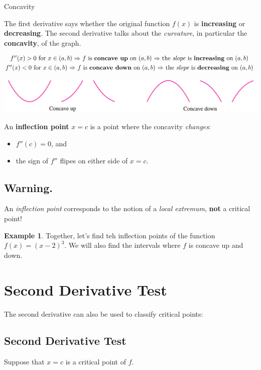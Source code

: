 \message{ !name(11-16_seconddertest.tex)}\documentclass[11pt,reqno,final]{amsart}
\numberwithin{figure}{section}
\theoremstyle{definition} %
\newtheorem{example}[equation]{Example}%
\begin{document}
{Concavity}

The first derivative says whether the original function $f(x)$ is \textbf{increasing} or \textbf{decreasing}.
The second derivative talks about the \textit{curvature}, in particular the \textbf{concavity}, of the graph.

\begin{framed}
        \begin{gather*}
                \mbox{$f''(x) > 0$ for $x \in (a,b)$
                  $\Rightarrow$
                  $f$ is \textbf{concave up} on $(a,b)$
                  $\Rightarrow$
                  the \textit{slope} is \textbf{increasing} on $(a,b)$
                }\\
                \mbox{$f''(x) < 0$ for $x \in (a,b)$
                  $\Rightarrow$
                  $f$ is \textbf{concave down} on $(a,b)$
                  $\Rightarrow$
                  the \textit{slope} is \textbf{decreasing} on $(a,b)$
                }
        \end{gather*}
\end{framed}
\begin{center}
        \includegraphics[width=\textwidth]{11-16P_concave}
\end{center}

An \textbf{inflection point} $x = c$ is a point where the concavity \textit{changes}:
\begin{itemize}
\item $f''(c) = 0$, and
\item the sign of $f''$ flipes on either side of $x = c$.
\end{itemize}
\subsection*{Warning.} An \textit{inflection point} corresponds to the notion of a \textit{local extremum}, \textbf{not} a critical point!

\begin{example}
        Together, let's find teh inflection points of the function $f(x) = (x-2)^3$.
        We will also find the intervals where $f$ is concave up and down.
        \vfill
\end{example}


\section{Second Derivative Test}

The second derivative can also be used to classify critical points:
\subsection*{Second Derivative Test}
Suppose that $x = c$ is a critical point of $f$.
\end{document}

